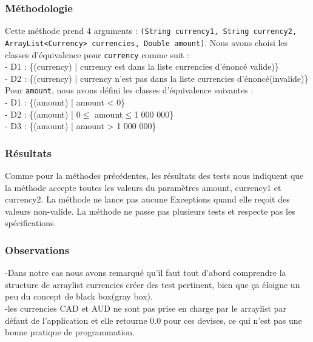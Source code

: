 \documentclass[11pt]{article}
\begin{document}
\subsubsection{Méthodologie}

Cette méthode prend 4 arguments : \texttt{(String currency1, String currency2, ArrayList<Currency> currencies, Double amount)}. Nous avons choisi les classes d'équivalence pour \texttt{currency} comme suit : \\

    \hspace{-7mm}
    - D1 : \{(currency) | currency est dans la liste currencies d'énoncé valide)\} \\
    - D2 : \{(currency) | currency n'est pas dans la liste currencies d'énoncé(invalide)\} \\

Pour \texttt{amount}, nous avons défini les classes d'équivalence suivantes : \\
    \hspace{-7mm}
    - D1 : \{(amount) | amount < 0\} \\
    - D2 : \{(amount) | 0$ \leq$ amount$ \leq $1 000 000\} \\
    - D3 : \{(amount) | amount > 1 000 000\} \\


\subsubsection{Résultats}
Comme pour la méthodes précédentes, les résultats des tests nous indiquent que la méthode accepte toutes les valeurs du paramètres amount, currency1 et currency2. La méthode ne lance pas aucune Exceptions quand elle reçoit des valeurs non-valide. La méthode ne passe pas plusieurs tests et respecte pas les spécifications.


\subsubsection{Observations}
-Dans notre cas nous avons remarqué qu'il faut tout d'abord comprendre la structure  de arraylist currencies créer des test pertinent, bien que ça éloigne un peu du concept de black box(gray box). \\

-les currencies CAD et AUD ne sont pas prise en charge par le arraylist par défaut de l'application et elle retourne 0.0 pour ces devises, ce qui n'est pas une bonne pratique de programmation.
\end{document}
